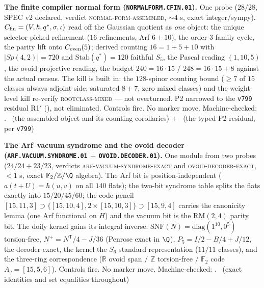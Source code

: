 \documentclass[11pt,a4paper]{article}
\newcommand{\Z}{\mathbb{Z}}
\theoremstyle{definition}
\begin{document}
\par\smallskip\noindent\textbf{The finite compiler normal form
(\texttt{NORMALFORM.CFIN.01}).}
One probe ($28/28$, SPEC v2 declared, verdict
\textsc{normal-form-assembled}, ${\sim}4$ s, exact
integer/sympy).  $C_{\rm fin} = (V, \hbar, q^{*}, \sigma, \iota)$
read off the Gaussian quotient as \emph{one} object: the unique
selector-picked refinement ($16$ refinements, Arf $6 + 10$), the
order-$3$ family cycle, the parity lift onto $C_{\rm even}(5)$;
derived counting $16 = 1 + 5 + 10$ with $\lvert Sp(4,2)\rvert =
720$ and $\mathrm{Stab}(q^{*}) = 120$ faithful $S_5$, the Pascal
reading $(1, 10, 5)$, the ovoid projective reading, the budget
$240 = 16\cdot15$ / $248 = 16\cdot15 + 8$ against the actual
census.  The kill is built in: the $128$-spinor counting bound
($\ge 7$ of $15$ classes always adjoint-side; saturated $8 + 7$,
zero mixed classes) and the weight-level kill re-verify
\textsc{rootclass-mixed} --- not overturned.  P2 narrowed to the
\texttt{v799} residual R1$'$ (\mC), not eliminated.  Controls
fire.  No marker move.
Machine-checked: .
\mE\ (the assembled object and its counting corollaries) $+$
\mC\ (the typed P2 residual, per \texttt{v799})
\par\smallskip

\par\smallskip\noindent\textbf{The Arf--vacuum syndrome and the
ovoid decoder (\texttt{ARF.VACUUM.SYNDROME.01} $+$
\texttt{OVOID.DECODER.01}).}
One module from two probes ($24/24 + 23/23$, verdicts
\textsc{arf-vacuum-syndrome-exact} and
\textsc{ovoid-decoder-exact}, ${<}1$ s, exact
$\mathbb{F}_2/\Z/\Q$ algebra).  The Arf bit is position-independent
($a(t{+}U) = \hbar(u,v)$ on all $140$ flats); the two-bit
syndrome table splits the flats exactly into $15/20/45/60$; the
code pencil $[15,11,3] \supset
\{[15,10,4], 2\times[15,10,3]\} \supset [15,9,4]$ carries the
canonicity lemma (one Arf functional on $H$) and the vacuum bit
is the $\mathrm{RM}(2,4)$ parity bit.  The doily kernel gains
its integral inverse: $\mathrm{SNF}(N) = \mathrm{diag}(1^{10},
0^5)$ torsion-free, $N^{+} = N^{\mathsf T}/4 - J/36$ (Penrose
exact in $\Q$), $P_5 = I/2 - B/4 + J/12$, the decoder exact, the
kernel the $S_6$ standard representation ($11/11$ classes), and
the three-ring correspondence ($\mathbb{R}$ ovoid span $/$ $\Z$
torsion-free $/$ $\mathbb{F}_2$ code $A_q = [15,5,6]$).  Controls fire.
No marker move.
Machine-checked: .
\mE\ (exact identities and set equalities throughout)
\par\smallskip
\end{document}
